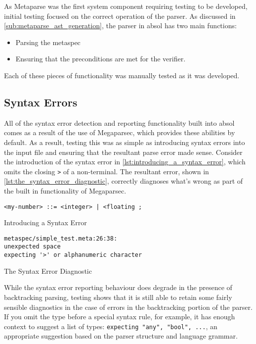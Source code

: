 As Metaparse was the first system component requiring testing to be developed, initial testing focused on the correct operation of the parser.
As discussed in \autoref{sub:metaparse_ast_generation}, the parser in \gls{absol} has two main functions:
\begin{itemize}
    \item Parsing the \gls{metaspec}
    \item Ensuring that the preconditions are met for the verifier.
\end{itemize}

Each of these pieces of functionality was manually tested as it was developed. 

\subsection{Syntax Errors} %
\label{sub:syntax_errors}
All of the syntax error detection and reporting functionality built into \gls{absol} comes as a result of the use of Megaparsec, which provides these abilities by default.
As a result, testing this was as simple as introducing syntax errors into the input file and ensuring that the resultant parse error made sense. 
Consider the introduction of the syntax error in \autoref{lst:introducing_a_syntax_error}, which omits the closing \texttt{>} of a non-terminal. 
The resultant error, shown in \autoref{lst:the_syntax_error_diagnostic}, correctly diagnoses what's wrong as part of the built in functionality of Megaparsec. 

\begin{listing}[!htb]
\begin{verbatim}
<my-number> ::= <integer> | <floating ;
\end{verbatim}
\caption{Introducing a Syntax Error}
\label{lst:introducing_a_syntax_error}
\end{listing}

\begin{listing}[!htb]
\begin{verbatim}
metaspec/simple_test.meta:26:38:
unexpected space
expecting '>' or alphanumeric character
\end{verbatim}
\caption{The Syntax Error Diagnostic}
\label{lst:the_syntax_error_diagnostic}
\end{listing}

While the syntax error reporting behaviour does degrade in the presence of backtracking parsing, testing shows that it is still able to retain some fairly sensible diagnostics in the case of errors in the backtracking portion of the parser. 
If you omit the type before a special syntax rule, for example, it has enough context to suggest a list of types: \texttt{expecting "any", "bool", ...}, an appropriate suggestion based on the parser structure and language grammar.

